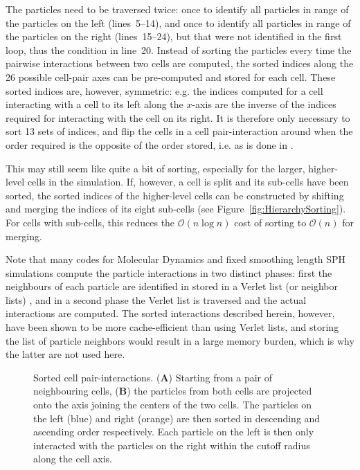 \documentclass[final]{siamltex}
\newcommand{\oh}[1]
    {\mbox{$ {\mathcal O}( #1 ) $}}
\newcommand{\fig}[1]
    {Figure~\ref{fig:#1}}
\newcommand{\bsf}[1]
    {\textbf{\textsf{#1}}}
\begin{document}
The particles need to be traversed twice: once to identify
all particles in range of the particles on the left (lines~5--14), and
once to identify all particles in range of the particles on the
right (lines~15--24), but that were not identified in the first loop, 
thus the condition in line~20.
Instead of sorting the particles every time the
pairwise interactions between two cells are computed,
the sorted indices along the 26 possible cell-pair axes can be
pre-computed and stored for each cell.
These sorted indices are, however, symmetric: e.g. the indices
computed for a cell interacting with a cell to its left along the
$x$-axis are the inverse of the indices required for interacting 
with the cell on its right.
It is therefore only necessary to sort 13 sets of indices, and flip
the cells in a cell pair-interaction around when the order
required is the opposite of the order stored, i.e. as is
done in \cite{ref:Gonnet2013}.

This may still seem like quite a bit of sorting, especially
for the larger, higher-level cells in the simulation.
If, however, a cell is split and its sub-cells have been sorted,
the sorted indices of the higher-level cells can be constructed
by shifting and merging the indices of its eight sub-cells
(see \fig{HierarchySorting}).
For cells with sub-cells, this reduces the \oh{n\log{n}} cost of sorting
to \oh{n} for merging. 

Note that many codes for Molecular Dynamics and fixed smoothing length
SPH simulations compute the particle interactions in two distinct phases:
first the neighbours of each particle are identified in stored in a
Verlet list (or neighbor lists) \cite{ref:Verlet1967},
and in a second phase the Verlet list
is traversed and the actual interactions are computed.
The sorted interactions described herein, however, have been shown
\cite{ref:Fomin2011} to be more cache-efficient than using Verlet
lists, and storing the list of particle neighbors would result in
a large memory burden, which is why the latter are not used here.


\begin{figure}
    \centerline{}
    
    \caption{Sorted cell pair-interactions. ({\bsf A}) Starting from a pair of
        neighbouring cells, ({\bsf B}) the particles from both cells
        are projected onto the axis joining the centers of the two cells.
        The particles on the left (blue) and right (orange) are
        then sorted in descending and ascending order respectively.
        Each particle on the left is then only interacted with
        the particles on the right within the cutoff radius along the cell axis.
        }
    \label{fig:SortedInteractions}
\end{figure}
\end{document}
